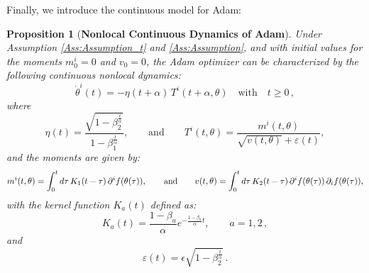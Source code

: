 \documentclass{article} %
\newtheorem{proposition}{Proposition}
\newcommand{\D}{{\rm d}}
\begin{document}
Finally, we introduce the continuous model for Adam:

\begin{proposition}[\textbf{Nonlocal Continuous Dynamics of Adam}]\label{prop:Adam}
Under Assumption \ref{Ass:Assumption_t} and \ref{Ass:Assumption}, and with initial values for the moments \( m^i_0 = 0 \) and \( v_0 = 0 \), the Adam optimizer can be characterized by the following continuous nonlocal dynamics:
\begin{equation}\label{eq:Adam_cont}
    \dot{\theta}^i(t) = - \eta(t+\alpha)\,T^i(t+\alpha,\theta) \quad \text{with} \quad t \geq 0\,,
\end{equation}
where
\begin{equation}
    \eta(t) = \frac{\sqrt{1-\beta_2^{\frac{t}{\alpha}}}}{1-\beta_1^{\frac{t}{\alpha}}} , \qquad \text{and} \qquad T^i(t,\theta) = \frac{m^i(t,\theta)}{\sqrt{v(t,\theta)}+\varepsilon (t)},
\end{equation}
and the moments are given by:
\begin{equation*}
    m^i(t,\theta) = \int^t_0 \D\tau\, K_1(t-\tau) \,\partial^i f(\theta(\tau)), \qquad \text{and} \qquad v(t,\theta) = \int^t_0 \D\tau\, K_2(t-\tau) \,\partial^i f(\theta(\tau)) \,\partial_i f(\theta(\tau)),
\end{equation*}
with the kernel function \( K_a(t) \) defined as:
\begin{equation*}
     K_a(t) = \frac{1-\beta_a}{\alpha} e^{-\frac{1-\beta_a}{\alpha} t}, \qquad a = 1,2\,,
\end{equation*}
and 
\[
\varepsilon(t) = \epsilon\sqrt{1-\beta_2^\frac{t}{\alpha}}\,.
\]
\end{proposition}
\end{document}
